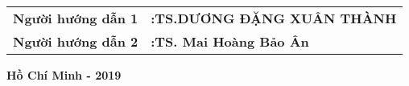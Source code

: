 \begin{titlepage}
\begin{center}
\begin{tabular}{l l }
\bf \large Người hướng dẫn 1&\bf \large:\quad TS.DƯƠNG ĐẶNG XUÂN THÀNH\\[4pt]
\bf \large Người hướng dẫn 2&\bf \large:\quad TS. Mai Hoàng Bảo Ân\\[4pt]

\end{tabular}
\vfill

{\large\bf Hồ Chí Minh - 2019}
\end{center}


\end{titlepage}